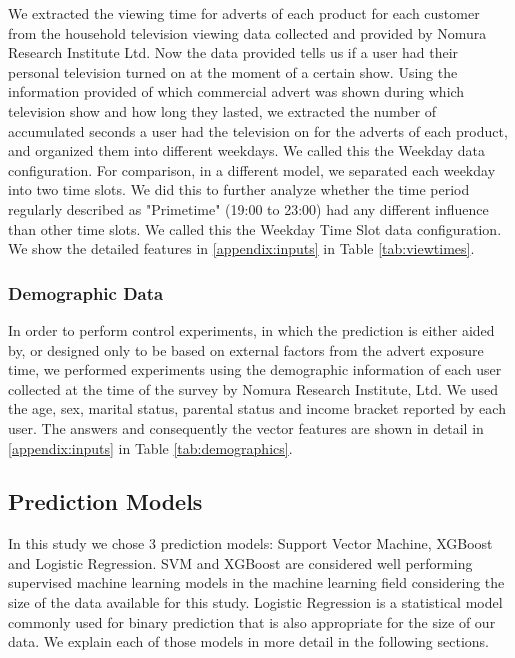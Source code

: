 \documentclass[review]{elsarticle}
\begin{document}
We extracted the viewing time for adverts of each product for each customer from the household television viewing data collected and provided by Nomura Research Institute Ltd. Now the data provided tells us if a user had their personal television turned on at the moment of a certain show. Using the information provided of which commercial advert was shown during which television show and how long they lasted, we extracted the number of accumulated seconds a user had the television on for the adverts of each product, and organized them into different weekdays. We called this the Weekday data configuration. For comparison, in a different model, we separated each weekday into two time slots. We did this to further analyze whether the time period regularly described as "Primetime" (19:00 to 23:00) had any different influence than other time slots. We called this the Weekday Time Slot data configuration. We show the detailed features in \ref{appendix:inputs} in Table \ref{tab:viewtimes}.

\subsubsection{Demographic Data}
\label{demographics}

In order to perform control experiments, in which the prediction is either aided by, or designed only to be based on external factors from the advert exposure time, we performed experiments using the demographic information of each user collected at the time of the survey by Nomura Research Institute, Ltd. We used the age, sex, marital status, parental status and income bracket reported by each user. The answers and consequently the vector features are shown in detail in \ref{appendix:inputs} in Table \ref{tab:demographics}.

\subsection{Prediction Models}
\label{pred_models}

In this study we chose 3 prediction models: Support Vector Machine, XGBoost and Logistic Regression. SVM and XGBoost are considered well performing supervised machine learning models in the machine learning field considering the size of the data available for this study. Logistic Regression is a statistical model commonly used for binary prediction that is also appropriate for the size of our data. We explain each of those models in more detail in the following sections.
\end{document}
